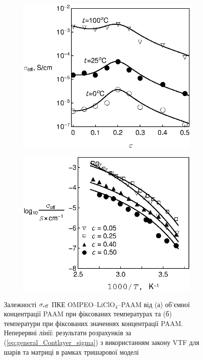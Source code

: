 \documentclass[twoside,a4paper,14pt]{vakaref}
\begin{document}
\begin{figure}[tb]
	\centering
	\begin{subfigure}[t]{0.45\textwidth}
		\includegraphics[width=\textwidth]{Fig6_Isochores2.eps}
		\caption{} 
		\label{fig:OMPEO-LiClO4-Temp-a}
	\end{subfigure}%
	\quad
	\begin{subfigure}[t]{0.47\textwidth}
		\includegraphics[width=\textwidth]{Fig8_TemperatureDependence_4.eps}
		\caption{} \label{fig:OMPEO-LiClO4-TempDependence}
	\end{subfigure}%
	\caption{\label{fig:OMPEO-LiClO4-Temp} Залежності $\sigma_{\rm eff}$ ПКЕ OMPEO--LiClO$_4$--PAAM \cite{Wiec1994} від (а) об'ємної концентрації PAAM при фіксованих температурах та (б) температури при фіксованих значеннях концентрації PAAM.
		Неперервні лінії: результати розрахунків за (\ref{eq:general_Contlayer_sigma}) з використанням закону VTF для шарів та матриці
		в рамках тришарової моделі}
	\vspace{-10pt}
\end{figure}
\end{document}
